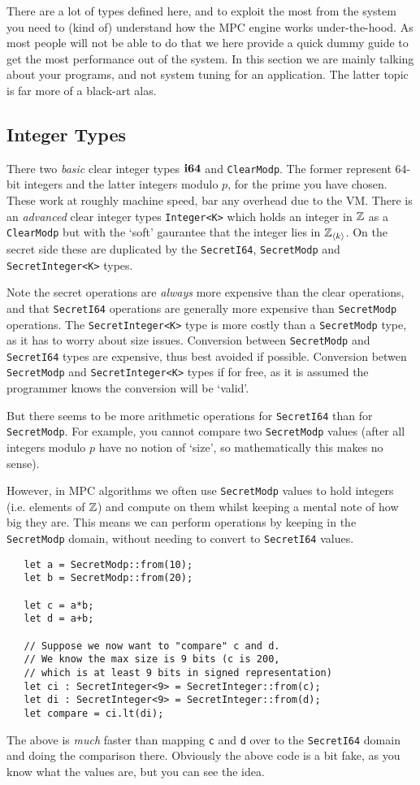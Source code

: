 There are a lot of types defined here, and to exploit the most
from the system you need to (kind of) understand how the MPC
engine works under-the-hood. As most people will not be able
to do that we here provide a quick dummy guide to get the most
performance out of the system.
In this section we are mainly talking about your programs, and
not system tuning for an application. The latter topic is far
more of a black-art alas.

\subsection{Integer Types}
There two {\em basic} clear integer types $\mathbf{i64}$ and \verb|ClearModp|.
The former represent $64$-bit integers and the latter integers
modulo $p$, for the prime you have chosen. These work at
roughly machine speed, bar any overhead due to the VM.
There is an {\em advanced} clear integer types \verb|Integer<K>|
which holds an integer in ${\mathbb{Z}}$ as a \verb|ClearModp| but with the 
`soft' gaurantee that the integer lies in ${\mathbb{Z}}_{\langle k \rangle}$.
On the secret side these are duplicated by the \verb|SecretI64|,
\verb|SecretModp| and \verb|SecretInteger<K>| types.

Note the secret operations are {\em always} more expensive than
the clear operations, and that \verb|SecretI64| operations are
generally more expensive than \verb|SecretModp| operations.
The \verb|SecretInteger<K>| type is more costly than a
\verb|SecretModp| type, as it has to worry about size issues.
Conversion between \verb|SecretModp| and  \verb|SecretI64| types
are expensive, thus best avoided if possible.
Conversion betwen \verb|SecretModp| and  \verb|SecretInteger<K>|
types if for free, as it is assumed the programmer knows
the conversion will be `valid'.

But there seems to be more arithmetic operations for \verb|SecretI64|
than for \verb|SecretModp|. For example, you cannot compare
two \verb|SecretModp| values (after all integers modulo $p$ have
no notion of `size', so mathematically this makes no sense).

However, in MPC algorithms we often use \verb|SecretModp| values
to hold integers (i.e. elements of ${\mathbb{Z}}$) and compute on them
whilst keeping a mental note of how big they are. This means
we can perform operations by keeping in the \verb|SecretModp|
domain, without needing to convert to \verb|SecretI64| values.

\begin{lstlisting}
   let a = SecretModp::from(10);
   let b = SecretModp::from(20);

   let c = a*b;
   let d = a+b;

   // Suppose we now want to "compare" c and d.
   // We know the max size is 9 bits (c is 200,
   // which is at least 9 bits in signed representation)
   let ci : SecretInteger<9> = SecretInteger::from(c);
   let di : SecretInteger<9> = SecretInteger::from(d);
   let compare = ci.lt(di);
\end{lstlisting}
The above is {\em much} faster than mapping \verb|c|
and \verb|d| over to the \verb|SecretI64| domain and doing
the comparison there.
Obviously the above code is a bit fake, as you know what the
values are, but you can see the idea.


